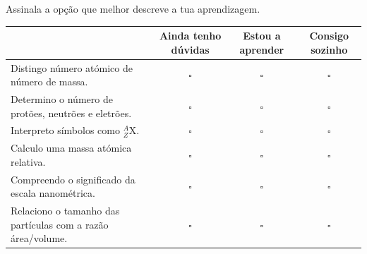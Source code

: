 \documentclass[11pt,a4paper]{article}
\begin{document}
	Assinala a opção que melhor descreve a tua aprendizagem.
	
	\begin{center}
		
		\begin{tabularx}{\textwidth}{
				>{\raggedright\arraybackslash}X
				c c c
			}
			\toprule
			&
			\textbf{Ainda tenho dúvidas}
			&
			\textbf{Estou a aprender}
			&
			\textbf{Consigo sozinho}
			\\
			\midrule
			
			Distingo número atómico de número de massa.
			&
			\(\square\)&\(\square\)&\(\square\)
			\\[3mm]
			
			Determino o número de protões, neutrões e eletrões.
			&
			\(\square\)&\(\square\)&\(\square\)
			\\[3mm]
			
			Interpreto símbolos como
			\({}^{A}_{Z}\mathrm{X}\).
			&
			\(\square\)&\(\square\)&\(\square\)
			\\[3mm]
			
			Calculo uma massa atómica relativa.
			&
			\(\square\)&\(\square\)&\(\square\)
			\\[3mm]
			
			Compreendo o significado da escala nanométrica.
			&
			\(\square\)&\(\square\)&\(\square\)
			\\[3mm]
			
			Relaciono o tamanho das partículas com a razão área/volume.
			&
			\(\square\)&\(\square\)&\(\square\)
			\\
			
			\bottomrule
		\end{tabularx}
		
	\end{center}
	
	\vfill
	
	\begin{center}
	\end{center}
	
\end{document}

